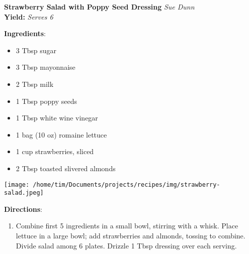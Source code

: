 \documentclass[11pt, twoside, openany]{book}
\begin{document}
\noindent\begin{minipage}[t]{\linewidth}%
{\Large\textbf{Strawberry Salad with Poppy Seed Dressing}} \label{strawberry-salad-with-poppy-seed-dressing}\hfill\textit{Sue Dunn}\\
\textbf{Yield:} \textit{Serves 6}\\
\noindent\begin{minipage}[t]{0.78\linewidth}%
\textbf{Ingredients}:\vspace{-3mm}
\begin{multicols}{2}
\begin{itemize}\setlength\itemsep{-1mm}
\item 3 Tbsp sugar
\item 3 Tbsp mayonnaise
\item 2 Tbsp milk
\item 1 Tbsp poppy seeds
\item 1 Tbsp white wine vinegar
\item 1 bag (10 oz) romaine lettuce
\item 1 cup strawberries, sliced
\item 2 Tbsp toasted slivered almonds
\end{itemize}
\end{multicols}
\end{minipage}
\noindent\begin{minipage}[t]{0.18\linewidth}
\centering \strut\vspace*{-\baselineskip}\newline
\texttt{[image: /home/tim/Documents/projects/recipes/img/strawberry-salad.jpeg]}\\
\end{minipage}\vspace{3mm}
\textbf{Directions}:
\vspace{-3mm}\begin{enumerate}\setlength\itemsep{-1mm}
\item Combine first 5 ingredients in a small bowl, stirring with a whisk. Place lettuce in a large bowl; add strawberries and almonds, tossing to combine. Divide salad among 6 plates. Drizzle 1 Tbsp dressing over each serving.
\end{enumerate}
\end{minipage}\vspace{8mm}
\end{document}
